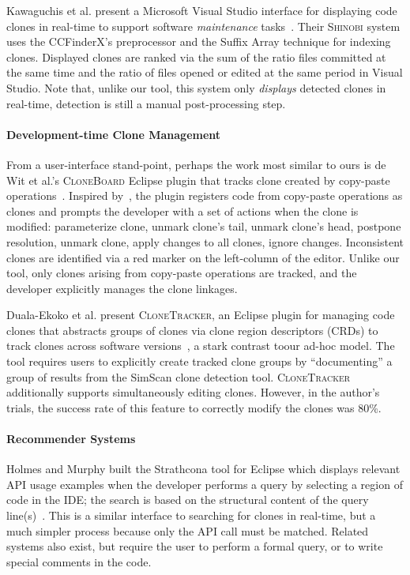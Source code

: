 \documentclass[nocopyrightspace,10pt]{sigplanconf}
\newcommand{\todo}[1]{{\bfseries [[#1]]}}
\renewcommand{\todo}[1]{\relax}
\begin{document}
Kawaguchis et al. present a  
Microsoft Visual Studio interface for
displaying code clones in real-time to support software
\emph{maintenance} tasks~\cite{Kawaguchi2009,Yamashina2008}. Their
\textsc{Shinobi} system uses the CCFinderX's preprocessor and the Suffix Array
technique for indexing clones. Displayed clones are ranked via the sum
of the ratio files committed at the same time and the ratio of files
opened or edited at the same period in Visual Studio. Note that, unlike our tool,
 this system only \emph{displays} detected clones in real-time, detection is still
 a manual post-processing step.

\paragraph{Development-time Clone Management}

From a user-interface stand-point, perhaps the work most similar to
ours is de Wit et al.'s \textsc{CloneBoard} Eclipse plugin that tracks
clone created by copy-paste operations~\cite{deWit2009}. Inspired
by~\cite{Mann2006}, the plugin registers code from copy-paste
operations as clones and prompts the developer with a set of actions
when the clone is modified: parameterize clone, unmark clone's tail,
unmark clone's head, postpone resolution, unmark clone, apply changes
to all clones, ignore changes. Inconsistent clones are identified via
a red marker on the left-column of the editor. Unlike our tool, only
clones arising from copy-paste operations are tracked, and the
developer explicitly manages the clone linkages.

Duala-Ekoko et al. present \textsc{CloneTracker}, an Eclipse plugin
for managing code clones that abstracts groups of clones via clone
region descriptors (CRDs) to track clones across software
versions~\cite{Duala-Ekoko2007}, a stark contrast toour ad-hoc model.
 The tool requires users to explicitly
create tracked clone groups by ``documenting'' a group of results from
the SimScan clone detection tool. \textsc{CloneTracker} additionally
supports simultaneously editing clones. However, in the author's
trials, the success rate of this feature to correctly modify the
clones was 80\%.

\paragraph{Recommender Systems}

Holmes and Murphy built the Strathcona tool for Eclipse which displays
relevant API usage examples when the developer performs a query by
selecting a region of code in the IDE; the search is based on the
structural content of the query line(s)~\cite{Holmes2005}. 
This is a similar interface to searching for clones in real-time, but a
much simpler process because only the API call must be matched.
Related systems also exist, but require the user to
perform a formal query, or to write special comments in the code.
\end{document}

